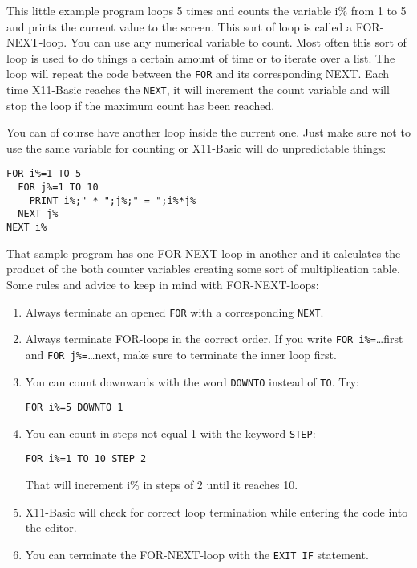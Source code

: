 This little example program loops 5 times and counts the variable i\% from 1 to
5 and prints the current value to the screen. This sort of loop is called a
FOR-NEXT-loop. You can use any numerical variable to count. Most often this
sort of loop is used to do things a certain amount of time or to iterate over a
list. The loop will repeat the code between the \verb|FOR| and its corresponding NEXT.
Each time X11-Basic reaches the \verb|NEXT|, it will increment the count variable and
will stop the loop if the maximum count has been reached.

You can of course have another loop inside the current one. Just make sure not
to use the same variable for counting or X11-Basic will do unpredictable things:
\begin{mdframed}[hidealllines=true,backgroundcolor=blue!20]
\begin{verbatim}
FOR i%=1 TO 5
  FOR j%=1 TO 10
    PRINT i%;" * ";j%;" = ";i%*j%
  NEXT j%
NEXT i%
\end{verbatim}
\end{mdframed}

That sample program has one FOR-NEXT-loop in another and it calculates the
product of the both counter variables creating some sort of multiplication
table. Some rules and advice to keep in mind with FOR-NEXT-loops:

\begin{enumerate}
\item Always terminate an opened \verb|FOR| with a corresponding \verb|NEXT|.
\item Always
terminate FOR-loops in the correct order. If you write \verb|FOR i%=|\dots first and 
\verb|FOR j%=|\dots next, make sure to terminate the inner loop first.
\item You can count
downwards with the word \verb|DOWNTO| instead of \verb|TO|.
Try:
\begin{mdframed}[hidealllines=true,backgroundcolor=blue!20]
\begin{verbatim}
FOR i%=5 DOWNTO 1
\end{verbatim}
\end{mdframed}
\item You can count in steps not equal 1 with the keyword \verb|STEP|: 
\begin{mdframed}[hidealllines=true,backgroundcolor=blue!20]
\begin{verbatim}
FOR i%=1 TO 10 STEP 2
\end{verbatim}
\end{mdframed}
That will increment i\% in steps of 2 until it reaches 10. 
\item X11-Basic will
check for correct loop termination while entering the code into the editor. 
\item You can terminate the FOR-NEXT-loop with the \verb|EXIT IF| statement.
\end{enumerate}

